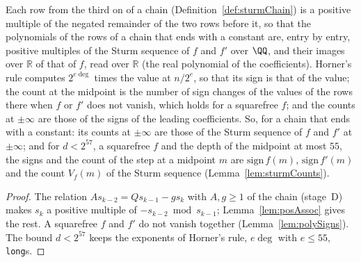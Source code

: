 \begin{lemma}\label{lem:chainSturm}
  \leanok
  Each row from the third on of a chain (Definition~\ref{def:sturmChain}) is a positive multiple of
  the negated remainder of the two rows before it, so that the polynomials of the rows of a chain
  that ends with a constant are, entry by entry, positive multiples of the Sturm sequence of $f$ and
  $f'$ over $\QQ$, and their images over $\mathbb{R}$ of that of $f$, read over $\mathbb{R}$ (the
  real polynomial of the coefficients). Horner's rule computes $2^{e \deg}$ times the value at
  $n/2^e$, so that its sign is that of the value; the count at the midpoint is the number of sign
  changes of the values of the rows there when $f$ or $f'$ does not vanish, which holds for a
  squarefree $f$; and the counts at $\pm\infty$ are those of the signs of the leading coefficients.
  So, for a chain that ends with a constant: its counts at $\pm\infty$ are those of the Sturm
  sequence of $f$ and $f'$ at $\pm\infty$; and for $d < 2^{57}$, a squarefree $f$ and the depth of
  the midpoint at most $55$, the signs and the count of the step at a midpoint $m$ are
  $\mathrm{sign}\,f(m)$, $\mathrm{sign}\,f'(m)$ and the count $V_f(m)$ of the Sturm sequence
  (Lemma~\ref{lem:sturmCounts}).
\end{lemma}

\begin{proof}
  \leanok
  The relation $A s_{k-2} = Q s_{k-1} - g s_k$ with $A, g \ge 1$ of the chain (stage~D) makes $s_k$
  a positive multiple of $-s_{k-2} \bmod s_{k-1}$; Lemma~\ref{lem:posAssoc} gives the rest. A
  squarefree $f$ and $f'$ do not vanish together (Lemma~\ref{lem:polySigns}). The bound $d < 2^{57}$
  keeps the exponents of Horner's rule, $e \deg$ with $e \le 55$, \verb|long|s.
\end{proof}

